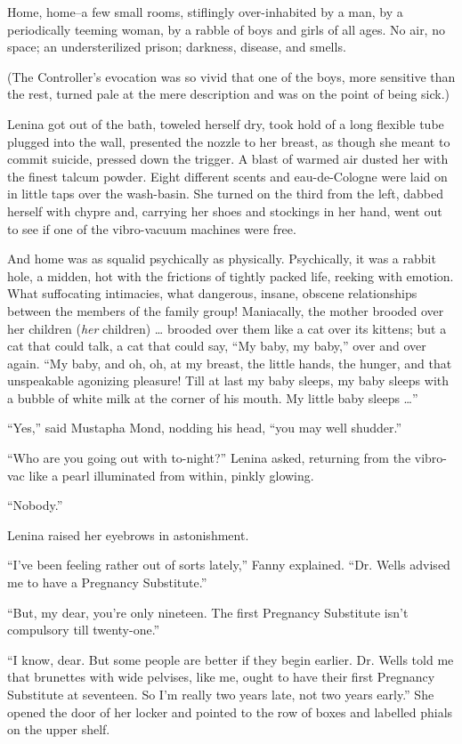 \documentclass[12pt]{report}
\begin{document}
Home, home--a few small rooms, stiflingly over-inhabited by a man, by a
periodically teeming woman, by a rabble of boys and girls of all ages.
No air, no space; an understerilized prison; darkness, disease, and
smells.

(The Controller's evocation was so vivid that one of the boys, more
sensitive than the rest, turned pale at the mere description and was on
the point of being sick.)

Lenina got out of the bath, toweled herself dry, took hold of a long
flexible tube plugged into the wall, presented the nozzle to her breast,
as though she meant to commit suicide, pressed down the trigger. A blast
of warmed air dusted her with the finest talcum powder. Eight different
scents and eau-de-Cologne were laid on in little taps over the
wash-basin. She turned on the third from the left, dabbed herself with
chypre and, carrying her shoes and stockings in her hand, went out to
see if one of the vibro-vacuum machines were free.

And home was as squalid psychically as physically. Psychically, it was a
rabbit hole, a midden, hot with the frictions of tightly packed life,
reeking with emotion. What suffocating intimacies, what dangerous,
insane, obscene relationships between the members of the family group!
Maniacally, the mother brooded over her children (\emph{her} children)
\ldots{} brooded over them like a cat over its kittens; but a cat that
could talk, a cat that could say, ``My baby, my baby,'' over and over
again. ``My baby, and oh, oh, at my breast, the little hands, the
hunger, and that unspeakable agonizing pleasure! Till at last my baby
sleeps, my baby sleeps with a bubble of white milk at the corner of his
mouth. My little baby sleeps \ldots{}''

``Yes,'' said Mustapha Mond, nodding his head, ``you may well shudder.''

``Who are you going out with to-night?'' Lenina asked, returning from
the vibro-vac like a pearl illuminated from within, pinkly glowing.

``Nobody.''

Lenina raised her eyebrows in astonishment.

``I've been feeling rather out of sorts lately,'' Fanny explained. ``Dr.
Wells advised me to have a Pregnancy Substitute.''

``But, my dear, you're only nineteen. The first Pregnancy Substitute
isn't compulsory till twenty-one.''

``I know, dear. But some people are better if they begin earlier. Dr.
Wells told me that brunettes with wide pelvises, like me, ought to have
their first Pregnancy Substitute at seventeen. So I'm really two years
late, not two years early.'' She opened the door of her locker and
pointed to the row of boxes and labelled phials on the upper shelf.
\end{document}

